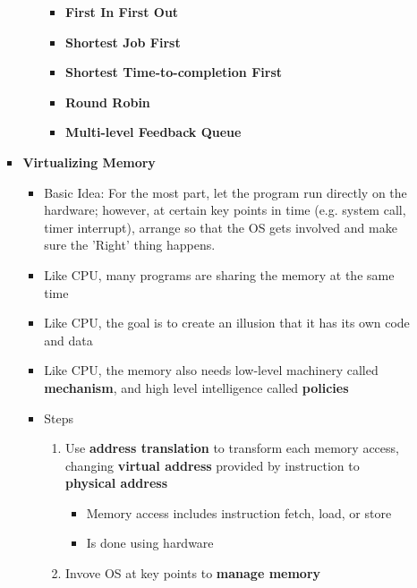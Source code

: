 \documentclass[12pt]{article}
\begin{document}
\begin{enumerate}[1.]
\begin{enumerate}[a)]
\begin{itemize}
\begin{itemize}
                \begin{itemize}
                    \item \textbf{First In First Out}
                    \item \textbf{Shortest Job First}
                    \item \textbf{Shortest Time-to-completion First}
                    \item \textbf{Round Robin}
                    \item \textbf{Multi-level Feedback Queue}
                \end{itemize}
            \end{itemize}

            \item \textbf{Virtualizing Memory}
            \begin{itemize}
                \item Basic Idea: For the most part, let the program run directly on the hardware;
                however, at certain key points in time (e.g. system call, timer interrupt), arrange
                so that the OS gets involved and make sure the 'Right' thing happens.
                \item Like CPU, many programs are sharing the memory at the same time
                \item Like CPU, the goal is to create an illusion that it has its own code and data
                \item Like CPU, the memory also needs low-level machinery called \textbf{mechanism},
                and high level intelligence called \textbf{policies}
                \item Steps

                \begin{enumerate}[1.]
                    \item Use \textbf{address translation} to transform each memory access,
                    changing \textbf{virtual address} provided by instruction to \textbf{physical address}
                    \begin{itemize}
                        \item Memory access includes instruction fetch, load, or store
                        \item Is done using hardware
                    \end{itemize}
                    \item Invove OS at key points to \textbf{manage memory}


\end{enumerate}
\end{itemize}
\end{itemize}
\end{enumerate}
\end{enumerate}
\end{document}
